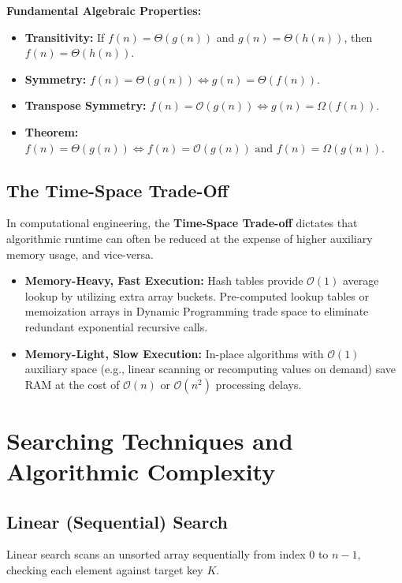 \documentclass[12pt,a4paper]{article}
\begin{document}
\par\vspace{4pt}\noindent
\textbf{Fundamental Algebraic Properties:}
\begin{itemize}[leftmargin=*, itemsep=2pt]
  \item \textbf{Transitivity:} If $f(n) = \Theta(g(n))$ and $g(n) = \Theta(h(n))$, then $f(n) = \Theta(h(n))$.
  \item \textbf{Symmetry:} $f(n) = \Theta(g(n)) \iff g(n) = \Theta(f(n))$.
  \item \textbf{Transpose Symmetry:} $f(n) = \mathcal{O}(g(n)) \iff g(n) = \Omega(f(n))$.
  \item \textbf{Theorem:} $f(n) = \Theta(g(n)) \iff f(n) = \mathcal{O}(g(n)) \text{ and } f(n) = \Omega(g(n))$.
\end{itemize}

\subsection{The Time-Space Trade-Off}
In computational engineering, the \textbf{Time-Space Trade-off} dictates that algorithmic runtime can often be reduced at the expense of higher auxiliary memory usage, and vice-versa.
\begin{itemize}[leftmargin=*, itemsep=3pt]
  \item \textbf{Memory-Heavy, Fast Execution:} Hash tables provide $\mathcal{O}(1)$ average lookup by utilizing extra array buckets. Pre-computed lookup tables or memoization arrays in Dynamic Programming trade space to eliminate redundant exponential recursive calls.
  \item \textbf{Memory-Light, Slow Execution:} In-place algorithms with $\mathcal{O}(1)$ auxiliary space (e.g., linear scanning or recomputing values on demand) save RAM at the cost of $\mathcal{O}(n)$ or $\mathcal{O}(n^2)$ processing delays.
\end{itemize}

\section{Searching Techniques and Algorithmic Complexity}

\subsection{Linear (Sequential) Search}
Linear search scans an unsorted array sequentially from index $0$ to $n-1$, checking each element against target key $K$.
\end{document}
